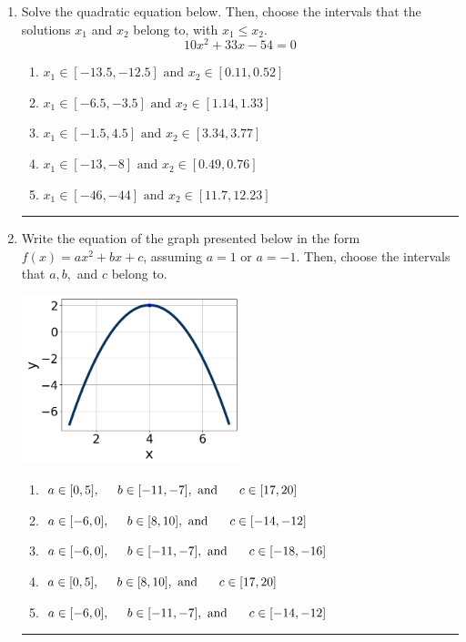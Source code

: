 \documentclass[14pt]{extbook}
\newcommand{\litem}[1]{\item#1\hspace*{-1cm}\rule{\textwidth}{0.4pt}}
\begin{document}
\begin{enumerate}
{\begin{enumerate}[label=\Alph*.]
\end{enumerate} }
\litem{
Solve the quadratic equation below. Then, choose the intervals that the solutions $x_1$ and $x_2$ belong to, with $x_1 \leq x_2$.\[ 10x^{2} +33 x -54 = 0 \]\begin{enumerate}[label=\Alph*.]
\item \( x_1 \in [-13.5, -12.5] \text{ and } x_2 \in [0.11, 0.52] \)
\item \( x_1 \in [-6.5, -3.5] \text{ and } x_2 \in [1.14, 1.33] \)
\item \( x_1 \in [-1.5, 4.5] \text{ and } x_2 \in [3.34, 3.77] \)
\item \( x_1 \in [-13, -8] \text{ and } x_2 \in [0.49, 0.76] \)
\item \( x_1 \in [-46, -44] \text{ and } x_2 \in [11.7, 12.23] \)

\end{enumerate} }
\litem{
Write the equation of the graph presented below in the form $f(x)=ax^2+bx+c$, assuming  $a=1$ or $a=-1$. Then, choose the intervals that $a, b,$ and $c$ belong to.
\begin{center}
    \includegraphics[width=0.5\textwidth]{../Figures/quadraticGraphToEquationCopyC.png}
\end{center}
\begin{enumerate}[label=\Alph*.]
\item \( a \in [0, 5], \hspace*{5mm} b \in [-11, -7], \text{ and } \hspace*{5mm} c \in [17, 20] \)
\item \( a \in [-6, 0], \hspace*{5mm} b \in [8, 10], \text{ and } \hspace*{5mm} c \in [-14, -12] \)
\item \( a \in [-6, 0], \hspace*{5mm} b \in [-11, -7], \text{ and } \hspace*{5mm} c \in [-18, -16] \)
\item \( a \in [0, 5], \hspace*{5mm} b \in [8, 10], \text{ and } \hspace*{5mm} c \in [17, 20] \)
\item \( a \in [-6, 0], \hspace*{5mm} b \in [-11, -7], \text{ and } \hspace*{5mm} c \in [-14, -12] \)


\end{enumerate}}
\end{enumerate}
\end{document}
